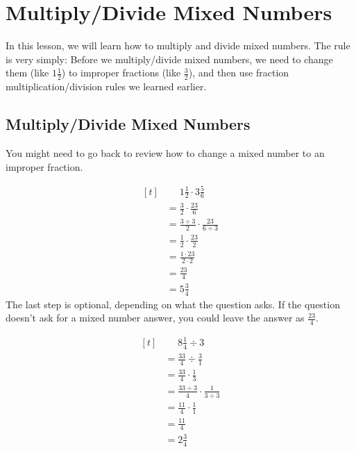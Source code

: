 
\section{Multiply/Divide Mixed Numbers}

In this lesson, we will learn how to multiply and divide mixed numbers. The rule is very simply: Before we multiply/divide mixed numbers, we need to change them (like $1\frac{1}{2}$) to improper fractions (like $\frac{3}{2}$), and then use fraction multiplication/division rules we learned earlier.

\subsection{Multiply/Divide Mixed Numbers}

You might need to go back to review how to change a mixed number to an improper fraction.

\begin{myexample}
\[ 
\begin{aligned}[t]
	&\phantom{{}=} 1\frac{1}{2} \cdot 3\frac{5}{6} \\
	&= \frac{3}{2} \cdot \frac{23}{6} \\
	&= \frac{3\div3}{2} \cdot \frac{23}{6\div3} \\
	&= \frac{1}{2} \cdot \frac{23}{2} \\
	&= \frac{1\cdot23}{2\cdot2} \\
	&= \frac{23}{4} \\
	&= 5\frac{3}{4}
\end{aligned}
\]
The last step is optional, depending on what the question asks. If the question doesn't ask for a mixed number answer, you could leave the answer as $\frac{23}{4}$.
\end{myexample}

\begin{myexample}
\[ 
\begin{aligned}[t]
	&\phantom{{}=} 8\frac{1}{4} \div 3 \\
	&= \frac{33}{4} \div \frac{3}{1} \\
	&= \frac{33}{4} \cdot \frac{1}{3} \\
	&= \frac{33\div3}{4} \cdot \frac{1}{3\div3} \\
	&= \frac{11}{4} \cdot \frac{1}{1} \\
	&= \frac{11}{4} \\
	&= 2\frac{3}{4}
\end{aligned}
\]
\end{myexample}

